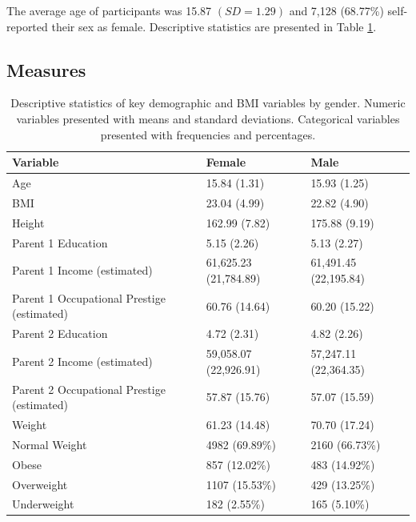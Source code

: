 \documentclass[man]{apa6}
\begin{document}
The average age of participants was 15.87 \((SD = 1.29)\) and 7,128 (68.77\%) self-reported their sex as female. Descriptive statistics are presented in Table \ref{tab:desc}.

\hypertarget{measures}{%
\subsection{Measures}\label{measures}}

\begin{table}[tbp]
\begin{center}
\begin{threeparttable}
\caption{\label{tab:desc}Descriptive statistics of key demographic and BMI variables by gender. Numeric variables presented with means and standard deviations. Categorical variables presented with frequencies and percentages.}
\begin{tabular}{lll}
\toprule
Variable & Female & Male\\
\midrule
Age & 15.84 (1.31) & 15.93 (1.25)\\
BMI & 23.04 (4.99) & 22.82 (4.90)\\
Height & 162.99 (7.82) & 175.88 (9.19)\\
Parent 1 Education & 5.15 (2.26) & 5.13 (2.27)\\
Parent 1 Income (estimated) & 61,625.23 (21,784.89) & 61,491.45 (22,195.84)\\
Parent 1 Occupational Prestige (estimated) & 60.76 (14.64) & 60.20 (15.22)\\
Parent 2 Education & 4.72 (2.31) & 4.82 (2.26)\\
Parent 2 Income (estimated) & 59,058.07 (22,926.91) & 57,247.11 (22,364.35)\\
Parent 2 Occupational Prestige (estimated) & 57.87 (15.76) & 57.07 (15.59)\\
Weight & 61.23 (14.48) & 70.70 (17.24)\\
Normal Weight & 4982 (69.89\%) & 2160 (66.73\%)\\
Obese & 857 (12.02\%) & 483 (14.92\%)\\
Overweight & 1107 (15.53\%) & 429 (13.25\%)\\
Underweight & 182 (2.55\%) & 165 (5.10\%)\\
\bottomrule
\end{tabular}
\end{threeparttable}
\end{center}
\end{table}
\end{document}

